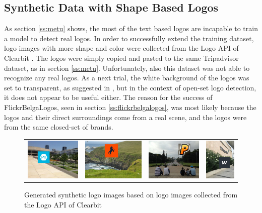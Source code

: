 \subsection{Synthetic Data with Shape Based Logos}

As section \ref{ss:metu} shows, the most of the text based logos are incapable to train a model to detect real logos. In order to successfully extend the training dataset, logo images with more shape and color were collected from the Logo API of Clearbit \cite{LogoClearbit}. The logos were simply copied and pasted to the same Tripadvisor dataset, as in section \ref{ss:metu}. Unfortunately, also this dataset was not able to recognize any real logos. As a next trial, the white background of the logos was set to transparent, as suggested in \cite{DBLP:journals/corr/SuZG16}, but in the context of open-set logo detection, it does not appear to be useful either. The reason for the success of FlickrBelgaLogos, seen in section \ref{ss:flickrbelgalogos}, was most likely because the logos and their direct surroundings come from a real scene, and the logos were from the same closed-set of brands.
\bigbreak
\begin{figure}
  \centering
\begin{tabular}{cccc}
  \includegraphics[height=20mm]{images/mt/clearbit1.jpg} &   \includegraphics[height=20mm]{images/mt/clearbit2.jpg}  & \includegraphics[height=20mm]{images/mt/clearbit3.jpg} &   \includegraphics[height=20mm]{images/mt/clearbit4.jpg}
\end{tabular}
\caption{Generated synthetic logo images based on logo images collected from the Logo API of Clearbit \cite{LogoClearbit}}
\label{f:synlogo}
\end{figure}
\bigbreak
